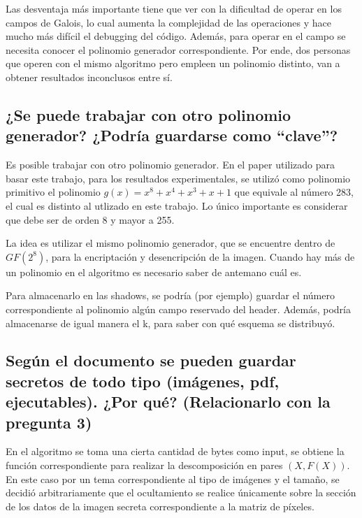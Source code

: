 \documentclass[11pt]{scrartcl} %
\begin{document}
Las desventaja más importante tiene que ver con la dificultad de operar en los campos de Galois, lo cual aumenta la complejidad de las operaciones y hace mucho más difícil el debugging del código. Además, para operar en el campo se necesita conocer el polinomio generador correspondiente. Por ende, dos personas que operen con el mismo algoritmo pero empleen un polinomio distinto, van a obtener resultados inconclusos entre sí.


\subsection{¿Se puede trabajar con otro polinomio generador? ¿Podría guardarse como “clave”?}

Es posible trabajar con otro polinomio generador. En el paper utilizado para basar este trabajo, para los resultados experimentales, se utilizó como polinomio primitivo el polinomio 
$g(x) = x^8 + x^4 + x^3 + x + 1$ que equivale al número 283, el cual es distinto al utlizado en este trabajo. Lo único importante es considerar que debe ser de orden 8 y mayor a 255.

La idea es utilizar el mismo polinomio generador, que se encuentre dentro de $GF(2^8)$, para la encriptación y desencripción de la imagen. Cuando hay más de un polinomio en el algoritmo es necesario saber de antemano cuál es.

Para almacenarlo en las shadows, se podría (por ejemplo) guardar el número correspondiente al polinomio algún campo reservado del header. Además, podría almacenarse de igual manera el k, para saber con qué esquema se distribuyó.


\subsection{Según el documento se pueden guardar secretos de todo tipo (imágenes, pdf, ejecutables). ¿Por qué? (Relacionarlo con la pregunta 3)}

En el algoritmo se toma una cierta cantidad de bytes como input, se obtiene la función correspondiente para realizar la descomposición en pares $(X, F(X))$. En este caso por un tema correspondiente al tipo de imágenes y el tamaño, se decidió arbitrariamente que el ocultamiento se realice únicamente sobre la sección de los datos de la imagen secreta correspondiente a la matriz de píxeles.
\end{document}

